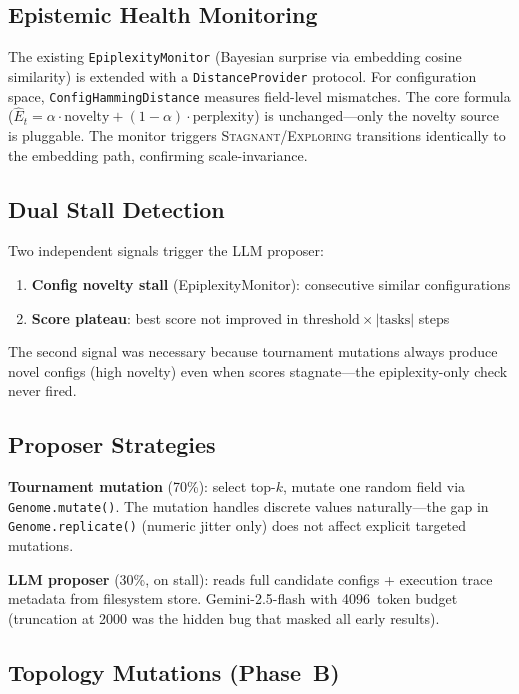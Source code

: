 \documentclass[11pt]{article}
\begin{document}
\subsection{Epistemic Health Monitoring}

The existing \texttt{EpiplexityMonitor} (Bayesian surprise via embedding
cosine similarity) is extended with a \texttt{DistanceProvider} protocol.
For configuration space, \texttt{ConfigHammingDistance} measures
field-level mismatches. The core formula ($\hat{E}_t = \alpha \cdot
\text{novelty} + (1-\alpha) \cdot \text{perplexity}$) is unchanged---only
the novelty source is pluggable. The monitor triggers
\textsc{Stagnant}/\textsc{Exploring} transitions identically to the
embedding path, confirming scale-invariance.

\subsection{Dual Stall Detection}

Two independent signals trigger the LLM proposer:
\begin{enumerate}
\item \textbf{Config novelty stall} (EpiplexityMonitor): consecutive
    similar configurations
\item \textbf{Score plateau}: best score not improved in
    $\text{threshold} \times |\text{tasks}|$ steps
\end{enumerate}
The second signal was necessary because tournament mutations always
produce novel configs (high novelty) even when scores stagnate---the
epiplexity-only check never fired.

\subsection{Proposer Strategies}

\textbf{Tournament mutation} (70\%): select top-$k$, mutate one random
field via \texttt{Genome.mutate()}. The mutation handles discrete values
naturally---the gap in \texttt{Genome.replicate()} (numeric jitter only)
does not affect explicit targeted mutations.

\textbf{LLM proposer} (30\%, on stall): reads full candidate configs +
execution trace metadata from filesystem store. Gemini-2.5-flash with
4096~token budget (truncation at 2000 was the hidden bug that masked all
early results).

\subsection{Topology Mutations (Phase~B)}
\end{document}
